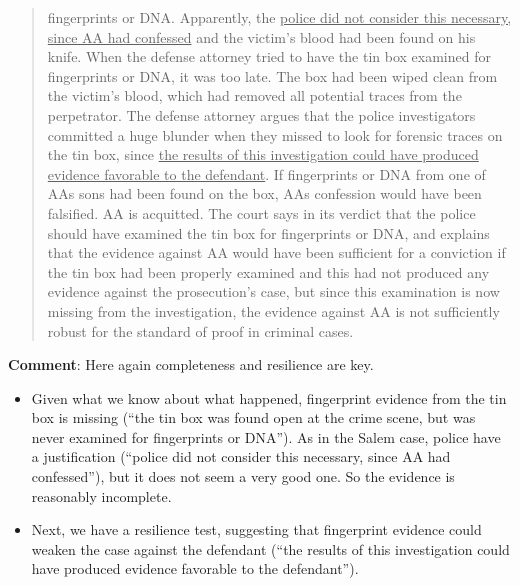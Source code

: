 \documentclass[
  10pt,
  dvipsnames,enabledeprecatedfontcommands]{scrartcl}
\providecommand{\tightlist}{%
  \setlength{\itemsep}{0pt}\setlength{\parskip}{0pt}}
\begin{document}
\begin{quote}
{fingerprints or DNA}. Apparently, the \underline{police did not consider this necessary, since AA had
confessed} and the victim’s blood had been found on his knife. When the defense attorney
tried to have the tin box examined for fingerprints or DNA, it was too late. The box had been
wiped clean from the victim’s blood, which had removed all potential traces from the
perpetrator. The defense attorney argues that the police investigators committed a huge
blunder when they missed to look for forensic traces on the tin box, since \underline{the results of this
investigation could have produced evidence favorable to the defendant}. If fingerprints or DNA
from one of AAs sons had been found on the box, AAs confession would have been falsified.
AA is acquitted. The court says in its verdict that the police should have examined the tin box
for fingerprints or DNA, and explains that the evidence against AA would have been sufficient
for a conviction if the tin box had been properly examined and this had not produced any
evidence against the prosecution’s case, but since this examination is now missing from the
investigation, the evidence against AA is not sufficiently robust for the standard of proof in
criminal cases.
\end{quote}


\textbf{Comment}: Here again completeness and resilience are key.

\begin{itemize}
\tightlist
\item
  Given what we know about what happened, fingerprint evidence from the
  tin box is missing (``the tin box was found open at the crime scene,
  but was never examined for fingerprints or DNA''). As in the Salem
  case, police have a justification (``police did not consider this
  necessary, since AA had confessed''), but it does not seem a very good
  one. So the evidence is reasonably incomplete.
\end{itemize}



\begin{itemize}
\tightlist
\item
  Next, we have a resilience test, suggesting that fingerprint evidence
  could weaken the case against the defendant (``the results of this
  investigation could have produced evidence favorable to the
  defendant'').
\end{itemize}
\end{document}
